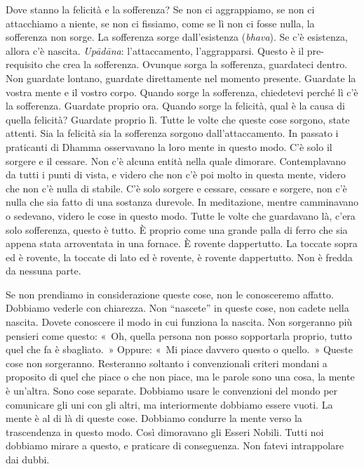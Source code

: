 Dove stanno la felicità e la sofferenza? Se non ci aggrappiamo, se non
ci attacchiamo a niente, se non ci fissiamo, come se lì non ci fosse
nulla, la sofferenza non sorge. La sofferenza sorge dall'esistenza
(\emph{bhava}). Se c'è esistenza, allora c'è nascita. \emph{Upādāna}:
l'attaccamento, l'aggrapparsi. Questo è il pre-requisito che crea la
sofferenza. Ovunque sorga la sofferenza, guardateci dentro. Non guardate
lontano, guardate direttamente nel momento presente. Guardate la vostra
mente e il vostro corpo. Quando sorge la sofferenza, chiedetevi perché
lì c'è la sofferenza. Guardate proprio ora. Quando sorge la felicità,
qual è la causa di quella felicità? Guardate proprio lì. Tutte le volte
che queste cose sorgono, state attenti. Sia la felicità sia la
sofferenza sorgono dall'attaccamento. In passato i praticanti di Dhamma
osservavano la loro mente in questo modo. C'è solo il sorgere e il
cessare. Non c'è alcuna entità nella quale dimorare. Contemplavano da
tutti i punti di vista, e videro che non c'è poi molto in questa mente,
videro che non c'è nulla di stabile. C'è solo sorgere e cessare, cessare
e sorgere, non c'è nulla che sia fatto di una sostanza durevole. In
meditazione, mentre camminavano o sedevano, videro le cose in questo
modo. Tutte le volte che guardavano là, c'era solo sofferenza, questo è
tutto. È proprio come una grande palla di ferro che sia appena stata
arroventata in una fornace. È rovente dappertutto. La toccate sopra ed è
rovente, la toccate di lato ed è rovente, è rovente dappertutto. Non è
fredda da nessuna parte.

Se non prendiamo in considerazione queste cose, non le conosceremo
affatto. Dobbiamo vederle con chiarezza. Non ``nascete'' in queste cose,
non cadete nella nascita. Dovete conoscere il modo in cui funziona la
nascita. Non sorgeranno più pensieri come questo: «~Oh, quella persona
non posso sopportarla proprio, tutto quel che fa è sbagliato.~» Oppure:
«~Mi piace davvero questo o quello.~» Queste cose non sorgeranno.
Resteranno soltanto i convenzionali criteri mondani a proposito di quel
che piace o che non piace, ma le parole sono una cosa, la mente è
un'altra. Sono cose separate. Dobbiamo usare le convenzioni del mondo
per comunicare gli uni con gli altri, ma interiormente dobbiamo essere
vuoti. La mente è al di là di queste cose. Dobbiamo condurre la mente
verso la trascendenza in questo modo. Così dimoravano gli Esseri Nobili.
Tutti noi dobbiamo mirare a questo, e praticare di conseguenza. Non
fatevi intrappolare dai dubbi.

